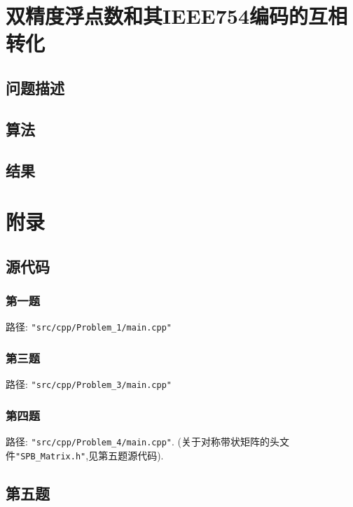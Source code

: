 \documentclass[UTF-8]{article}
\begin{document}
\section{双精度浮点数和其IEEE754编码的互相转化}
\subsection{问题描述}
\subsection{算法}
\subsection{结果}
\clearpage
\appendix
\section{附录}
\subsection{源代码}
\subsubsection{第一题}
\label{subsec:Q_1}
\noindent
路径: \texttt{"src/cpp/Problem\_1/main.cpp"}
\begin{spacing}{1.0}
	
\end{spacing}

\subsubsection{第三题}
\label{subsec:Q_3}
\noindent
路径: \texttt{"src/cpp/Problem\_3/main.cpp"}
\begin{spacing}{1.0}
	
\end{spacing}

\subsubsection{第四题}
\label{subsec:Q_4}
\noindent
路径: \texttt{"src/cpp/Problem\_4/main.cpp"}. (关于对称带状矩阵的头文件\texttt{"SPB\_Matrix.h"},见第五题源代码).
\begin{spacing}{1.0}
	
\end{spacing}

\subsection{第五题}
\end{document}
